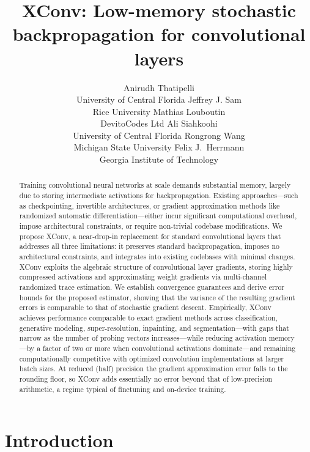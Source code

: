 \documentclass[10pt]{article}
\title{XConv: Low-memory stochastic backpropagation for convolutional layers}
\author{\name Anirudh Thatipelli \\
      \addr University of Central Florida
      \AND
      \name Jeffrey J. Sam \\
      \addr Rice University
      \AND
      \name Mathias Louboutin \\
      \addr DevitoCodes Ltd
      \AND
      \name Ali Siahkoohi \\
      \addr University of Central Florida
      \AND
      \name Rongrong Wang \\
      \addr Michigan State University
      \AND
      \name Felix J.\ Herrmann \\
      \addr Georgia Institute of Technology}
\begin{document}
\maketitle

\begin{abstract}
Training convolutional neural networks at scale demands substantial memory, largely due to storing intermediate activations for backpropagation. Existing approaches---such as checkpointing, invertible architectures, or gradient approximation methods like randomized automatic differentiation---either incur significant computational overhead, impose architectural constraints, or require non-trivial codebase modifications. We propose XConv, a near-drop-in replacement for standard convolutional layers that addresses all three limitations: it preserves standard backpropagation, imposes no architectural constraints, and integrates into existing codebases with minimal changes. XConv exploits the algebraic structure of convolutional layer gradients, storing highly compressed activations and approximating weight gradients via multi-channel randomized trace estimation. We establish convergence guarantees and derive error bounds for the proposed estimator, showing that the variance of the resulting gradient errors is comparable to that of stochastic gradient descent. Empirically, XConv achieves performance comparable to exact gradient methods across classification, generative modeling, super-resolution, inpainting, and segmentation---with gaps that narrow as the number of probing vectors increases---while reducing activation memory---by a factor of two or more when convolutional activations dominate---and remaining computationally competitive with optimized convolution implementations at larger batch sizes. At reduced (half) precision the gradient approximation error falls to the rounding floor, so XConv adds essentially no error beyond that of low-precision arithmetic, a regime typical of finetuning and on-device training.
\end{abstract}

\section{Introduction}
\label{introduction}
\end{document}
